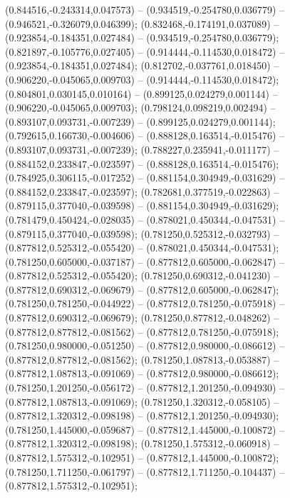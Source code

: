  (0.844516,-0.243314,0.047573) -- (0.934519,-0.254780,0.036779) -- (0.946521,-0.326079,0.046399);
 (0.832468,-0.174191,0.037089) -- (0.923854,-0.184351,0.027484) -- (0.934519,-0.254780,0.036779);
 (0.821897,-0.105776,0.027405) -- (0.914444,-0.114530,0.018472) -- (0.923854,-0.184351,0.027484);
 (0.812702,-0.037761,0.018450) -- (0.906220,-0.045065,0.009703) -- (0.914444,-0.114530,0.018472);
 (0.804801,0.030145,0.010164) -- (0.899125,0.024279,0.001144) -- (0.906220,-0.045065,0.009703);
 (0.798124,0.098219,0.002494) -- (0.893107,0.093731,-0.007239) -- (0.899125,0.024279,0.001144);
 (0.792615,0.166730,-0.004606) -- (0.888128,0.163514,-0.015476) -- (0.893107,0.093731,-0.007239);
 (0.788227,0.235941,-0.011177) -- (0.884152,0.233847,-0.023597) -- (0.888128,0.163514,-0.015476);
 (0.784925,0.306115,-0.017252) -- (0.881154,0.304949,-0.031629) -- (0.884152,0.233847,-0.023597);
 (0.782681,0.377519,-0.022863) -- (0.879115,0.377040,-0.039598) -- (0.881154,0.304949,-0.031629);
 (0.781479,0.450424,-0.028035) -- (0.878021,0.450344,-0.047531) -- (0.879115,0.377040,-0.039598);
 (0.781250,0.525312,-0.032793) -- (0.877812,0.525312,-0.055420) -- (0.878021,0.450344,-0.047531);
 (0.781250,0.605000,-0.037187) -- (0.877812,0.605000,-0.062847) -- (0.877812,0.525312,-0.055420);
 (0.781250,0.690312,-0.041230) -- (0.877812,0.690312,-0.069679) -- (0.877812,0.605000,-0.062847);
 (0.781250,0.781250,-0.044922) -- (0.877812,0.781250,-0.075918) -- (0.877812,0.690312,-0.069679);
 (0.781250,0.877812,-0.048262) -- (0.877812,0.877812,-0.081562) -- (0.877812,0.781250,-0.075918);
 (0.781250,0.980000,-0.051250) -- (0.877812,0.980000,-0.086612) -- (0.877812,0.877812,-0.081562);
 (0.781250,1.087813,-0.053887) -- (0.877812,1.087813,-0.091069) -- (0.877812,0.980000,-0.086612);
 (0.781250,1.201250,-0.056172) -- (0.877812,1.201250,-0.094930) -- (0.877812,1.087813,-0.091069);
 (0.781250,1.320312,-0.058105) -- (0.877812,1.320312,-0.098198) -- (0.877812,1.201250,-0.094930);
 (0.781250,1.445000,-0.059687) -- (0.877812,1.445000,-0.100872) -- (0.877812,1.320312,-0.098198);
 (0.781250,1.575312,-0.060918) -- (0.877812,1.575312,-0.102951) -- (0.877812,1.445000,-0.100872);
 (0.781250,1.711250,-0.061797) -- (0.877812,1.711250,-0.104437) -- (0.877812,1.575312,-0.102951);
